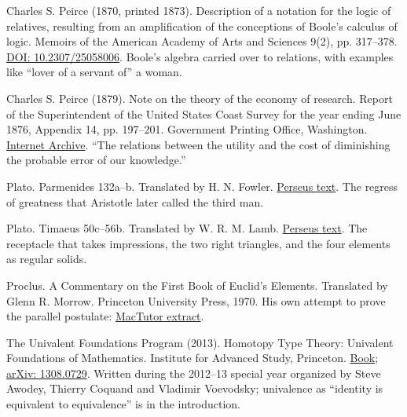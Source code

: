 \documentclass[11pt,twoside]{article}
\theoremstyle{thielethm}
\theoremstyle{thieledef}
\theoremstyle{thieledef}
\theoremstyle{thieledef}
\theoremstyle{thielethm}
\theoremstyle{thieleobs}
\theoremstyle{thielethm}
\begin{document}
\noindent Charles S. Peirce (1870, printed 1873). Description of a notation for the logic of relatives, resulting from an amplification of the conceptions of Boole's calculus of logic. Memoirs of the American Academy of Arts and Sciences 9(2), pp. 317--378. \href{https://doi.org/10.2307/25058006}{DOI: 10.2307/25058006}. Boole's algebra carried over to relations, with examples like ``lover of a servant of'' a woman.
\par\medskip

\noindent Charles S. Peirce (1879). Note on the theory of the economy of research. Report of the Superintendent of the United States Coast Survey for the year ending June 1876, Appendix 14, pp. 197--201. Government Printing Office, Washington. \href{https://archive.org/details/1876-us-coast-survey-report}{Internet Archive}. ``The relations between the utility and the cost of diminishing the probable error of our knowledge.''
\par\medskip

\noindent Plato. Parmenides 132a--b. Translated by H. N. Fowler. \href{https://www.perseus.tufts.edu/hopper/text?doc=Perseus:text:1999.01.0174:text=Parm.:section=132a}{Perseus text}. The regress of greatness that Aristotle later called the third man.
\par\medskip

\noindent Plato. Timaeus 50c--56b. Translated by W. R. M. Lamb. \href{https://www.perseus.tufts.edu/hopper/text?doc=Perseus:text:1999.01.0180}{Perseus text}. The receptacle that takes impressions, the two right triangles, and the four elements as regular solids.
\par\medskip

\noindent Proclus. A Commentary on the First Book of Euclid's Elements. Translated by Glenn R. Morrow. Princeton University Press, 1970. His own attempt to prove the parallel postulate: \href{https://mathshistory.st-andrews.ac.uk/Extras/Proclus_parallel_postulate/}{MacTutor extract}.
\par\medskip

\noindent The Univalent Foundations Program (2013). Homotopy Type Theory: Univalent Foundations of Mathematics. Institute for Advanced Study, Princeton. \href{https://homotopytypetheory.org/book/}{Book}; \href{https://arxiv.org/abs/1308.0729}{arXiv: 1308.0729}. Written during the 2012--13 special year organized by Steve Awodey, Thierry Coquand and Vladimir Voevodsky; univalence as ``identity is equivalent to equivalence'' is in the introduction.
\par\medskip
\end{document}

